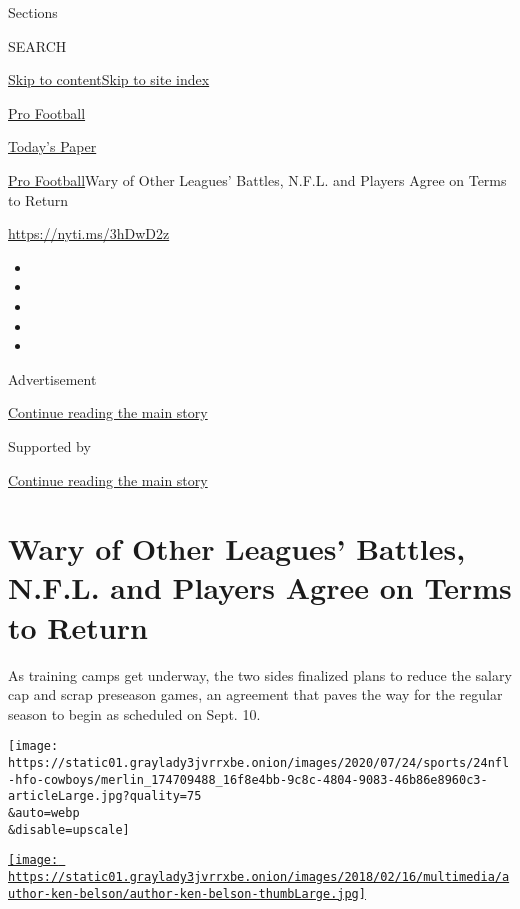 Sections

SEARCH

\protect\hyperlink{site-content}{Skip to
content}\protect\hyperlink{site-index}{Skip to site index}

\href{https://www.nytimes3xbfgragh.onion/section/sports/football}{Pro
Football}

\href{https://myaccount.nytimes3xbfgragh.onion/auth/login?response_type=cookie\&client_id=vi}{}

\href{https://www.nytimes3xbfgragh.onion/section/todayspaper}{Today's
Paper}

\href{/section/sports/football}{Pro Football}\textbar{}Wary of Other
Leagues' Battles, N.F.L. and Players Agree on Terms to Return

\url{https://nyti.ms/3hDwD2z}

\begin{itemize}
\item
\item
\item
\item
\item
\end{itemize}

Advertisement

\protect\hyperlink{after-top}{Continue reading the main story}

Supported by

\protect\hyperlink{after-sponsor}{Continue reading the main story}

\hypertarget{wary-of-other-leagues-battles-nfl-and-players-agree-on-terms-to-return}{%
\section{Wary of Other Leagues' Battles, N.F.L. and Players Agree on
Terms to
Return}\label{wary-of-other-leagues-battles-nfl-and-players-agree-on-terms-to-return}}

As training camps get underway, the two sides finalized plans to reduce
the salary cap and scrap preseason games, an agreement that paves the
way for the regular season to begin as scheduled on Sept. 10.

\texttt{[image: https://static01.graylady3jvrrxbe.onion/images/2020/07/24/sports/24nfl-hfo-cowboys/merlin\_174709488\_16f8e4bb-9c8c-4804-9083-46b86e8960c3-articleLarge.jpg?quality=75\\\&auto=webp\\\&disable=upscale]}

\href{https://www.nytimes3xbfgragh.onion/by/ken-belson}{\texttt{[image: https://static01.graylady3jvrrxbe.onion/images/2018/02/16/multimedia/author-ken-belson/author-ken-belson-thumbLarge.jpg]}}

